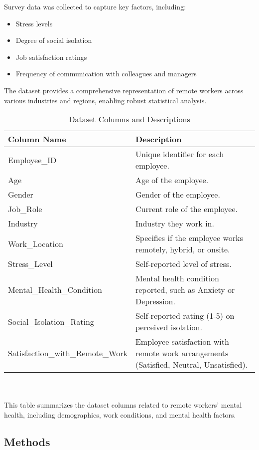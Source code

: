\documentclass[conference]{IEEEtran}
\begin{document}
Survey data was collected to capture key factors, including:
\begin{itemize}
    \item Stress levels
    \item Degree of social isolation
    \item Job satisfaction ratings
    \item Frequency of communication with colleagues and managers
\end{itemize}

The dataset provides a comprehensive representation of remote workers across various industries and regions, enabling robust statistical analysis.


\begin{table}[ht]
\centering
\caption{Dataset Columns and Descriptions}
\begin{tabular}{|l|p{4cm}|} %
\hline
\textbf{Column Name} & \textbf{Description} \\ \hline
Employee\_ID & Unique identifier for each employee. \\ \hline
Age & Age of the employee. \\ \hline
Gender & Gender of the employee. \\ \hline
Job\_Role & Current role of the employee. \\ \hline
Industry & Industry they work in. \\ \hline
Work\_Location & Specifies if the employee works remotely, hybrid, or onsite. \\ \hline
Stress\_Level & Self-reported level of stress. \\ \hline
Mental\_Health\_Condition & Mental health condition reported, such as Anxiety or Depression. \\ \hline
Social\_Isolation\_Rating & Self-reported rating (1-5) on perceived isolation. \\ \hline
Satisfaction\_with\_Remote\_Work & Employee satisfaction with remote work arrangements (Satisfied, Neutral, Unsatisfied). \\ \hline
\end{tabular}
\label{tab:dataset_columns}
\\
\small
\textit\\{This table summarizes the dataset columns related to remote workers' mental health, including demographics, work conditions, and mental health factors.}
\end{table}


\subsection{Methods}
\end{document}
